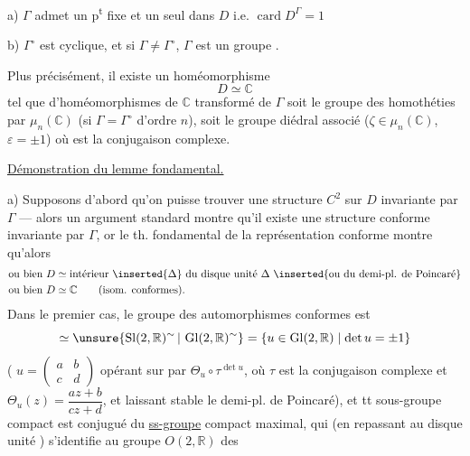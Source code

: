  a) $\Gamma$ admet un p\textsuperscript{t} fixe et un seul dans $D$ i.e. $\operatorname{card}D^\Gamma=1$

 b)  $\Gamma^\circ$ est cyclique, et si $\Gamma\ne\Gamma^\circ$, $\Gamma$ est un groupe .

Plus précisément, il existe un homéomorphisme
\[
D\simeq\mathbb C
\]
tel que    d'homéomorphismes de $\mathbb C$ transformé de   $\Gamma$ soit le groupe des homothéties par $\mu_n(\mathbb C)$ (si $\Gamma=\Gamma^\circ$ d'ordre $n$), soit le groupe diédral associé  ($\zeta\in\mu_n(\mathbb C)$, $\varepsilon=\pm1$) où \unsure{$\sigma$}  est la conjugaison complexe.

\uline{Démonstration du lemme fondamental.}







 a) Supposons d'abord qu'on puisse trouver une structure $C^2$ sur $D$ invariante par $\Gamma$ --- alors un argument standard montre qu'il existe une structure conforme invariante par $\Gamma$, or le th. fondamental de la représentation conforme montre qu'alors
\[
\begin{aligned}
&\text{ou bien }D\simeq\text{intérieur}\ \inserted{\Delta}\ \text{du disque unité }\Delta\ \inserted{\text{ou du demi-pl. de Poincaré}}\\
&\text{ou bien }D\simeq\mathbb C\qquad\text{(isom. conformes).}
\end{aligned}
\]
Dans le premier cas, le groupe des automorphismes  conformes est
\[
\simeq\unsure{\operatorname{Sl}(2,\mathbb R)^\sim\,|\,\operatorname{Gl}(2,\mathbb R)^\sim}
=\{u\in\operatorname{Gl}(2,\mathbb R)\mid\det u=\pm1\}
\]
( $u=\left(\begin{smallmatrix}a&b\\c&d\end{smallmatrix}\right)$ opérant sur   par  $\Theta_u\circ\tau^{\det u}$, où $\tau$ est la conjugaison complexe et $\Theta_u(z)=\dfrac{az+b}{cz+d}$, et laissant stable le demi-pl. de Poincaré), et tt sous-groupe compact est  conjugué du \uline{ss-groupe} compact maximal, qui (en repassant au disque unité \inserted{$\Delta$}) s'identifie au groupe $O(2,\mathbb R)$ des


